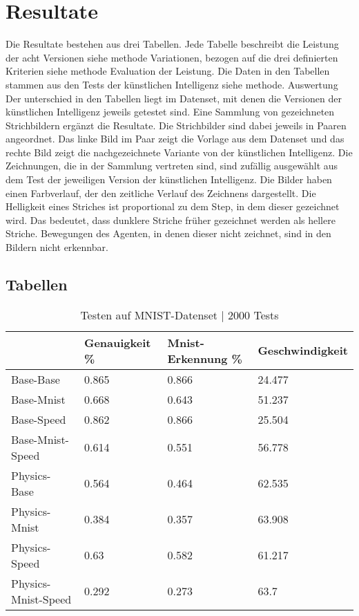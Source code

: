 \chapter{Resultate}
Die Resultate bestehen aus drei Tabellen. Jede Tabelle beschreibt die Leistung
der acht Versionen {siehe methode Variationen}, bezogen auf die drei definierten
Kriterien {siehe methode Evaluation der Leistung}. Die Daten in den Tabellen
stammen aus den Tests der künstlichen Intelligenz {siehe methode. Auswertung}
Der unterschied in den Tabellen liegt im Datenset, mit denen die Versionen der
künstlichen Intelligenz jeweils getestet sind. 
Eine Sammlung von gezeichneten Strichbildern ergänzt die Resultate. Die
Strichbilder sind dabei jeweils in Paaren angeordnet. Das linke Bild im Paar
zeigt die Vorlage aus dem Datenset und das rechte Bild zeigt die nachgezeichnete
Variante von der künstlichen Intelligenz. Die Zeichnungen, die in der Sammlung
vertreten sind, sind zufällig ausgewählt aus dem Test der jeweiligen Version der
künstlichen Intelligenz. Die Bilder haben einen Farbverlauf, der den zeitliche
Verlauf des Zeichnens dargestellt. Die Helligkeit eines Striches ist
proportional zu dem Step, in dem dieser gezeichnet wird. Das bedeutet, dass
dunklere Striche früher gezeichnet werden als hellere Striche. Bewegungen des
Agenten, in denen dieser nicht zeichnet, sind in den Bildern nicht erkennbar.

\newpage
\section{Tabellen}
\begin{table}[!ht]
    \centering
    \caption{Testen auf MNIST-Datenset | 2000 Tests}
    \begin{tabular}{|l|l|l|l|}
        \hline
            ~ & Genauigkeit \% & Mnist-Erkennung \% & Geschwindigkeit \\ \hline
            Base-Base & 0.865 & 0.866 & 24.477 \\ \hline
            Base-Mnist & 0.668 & 0.643 & 51.237 \\ \hline
            Base-Speed & 0.862 & 0.866 & 25.504 \\ \hline
            Base-Mnist-Speed & 0.614 & 0.551 & 56.778 \\ \hline
            Physics-Base & 0.564 & 0.464 & 62.535 \\ \hline
            Physics-Mnist & 0.384 & 0.357 & 63.908 \\ \hline
            Physics-Speed & 0.63 & 0.582 & 61.217 \\ \hline
            Physics-Mnist-Speed & 0.292 & 0.273 & 63.7 \\ \hline
        \end{tabular}
    \label{tab:MNIST}
\end{table}

